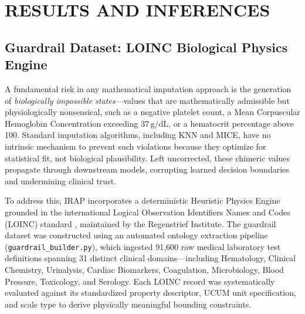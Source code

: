 \documentclass[MTech]{ugthesis}
\begin{document}
\chapter{RESULTS AND INFERENCES}
\label{chap:results}

\section{Guardrail Dataset: LOINC Biological Physics Engine}
\label{sec:guardrail_dataset}

A fundamental risk in any mathematical imputation approach is the generation of \emph{biologically impossible states}---values that are mathematically admissible but physiologically nonsensical, such as a negative platelet count, a Mean Corpuscular Hemoglobin Concentration exceeding $37\,\text{g/dL}$, or a hematocrit percentage above 100. Standard imputation algorithms, including KNN and MICE, have no intrinsic mechanism to prevent such violations because they optimize for statistical fit, not biological plausibility. Left uncorrected, these chimeric values propagate through downstream models, corrupting learned decision boundaries and undermining clinical trust.

To address this, IRAP incorporates a deterministic Heuristic Physics Engine grounded in the international Logical Observation Identifiers Names and Codes (\ac{LOINC}) standard \citep{regenstrief2024loinc}, maintained by the Regenstrief Institute. The guardrail dataset was constructed using an automated ontology extraction pipeline (\texttt{guardrail\_builder.py}), which ingested 91,600 raw medical laboratory test definitions spanning 31 distinct clinical domains---including Hematology, Clinical Chemistry, Urinalysis, Cardiac Biomarkers, Coagulation, Microbiology, Blood Pressure, Toxicology, and Serology. Each LOINC record was systematically evaluated against its standardized property descriptor, UCUM unit specification, and scale type to derive physically meaningful bounding constraints.
\end{document}

